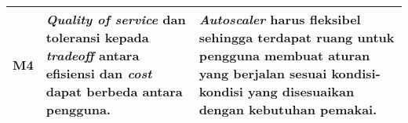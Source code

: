 \begin{table}[h]
\begin{center}
\begin{tabular}{|c|p{2.5in}|p{2.5in}|}
            M4 & \textit{Quality of service} dan toleransi kepada \textit{tradeoff} antara efisiensi dan \textit{cost} dapat berbeda antara pengguna. &
            \textit{Autoscaler} harus fleksibel sehingga terdapat ruang untuk pengguna membuat aturan yang berjalan sesuai kondisi-kondisi yang disesuaikan dengan kebutuhan pemakai.\tabularnewline

            \hline
        \end{tabular}
    \end{center}
    \label{tab:pemetaan-masalah}
\end{table}